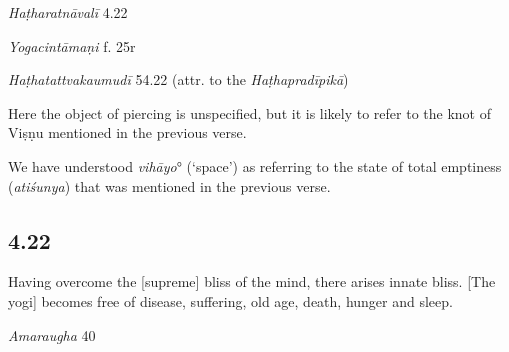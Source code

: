 \begin{ekdosis}
\begin{testimonia}[hp04_021]
\emph{Haṭharatnāvalī} 4.22
\begin{versinnote}
\end{versinnote}

\emph{Yogacintāmaṇi} f. 25r
\begin{versinnote}
\end{versinnote}

\emph{Haṭhatattvakaumudī} 54.22 (attr. to the \emph{Haṭhapradīpikā})
\begin{versinnote}
\end{versinnote}
\end{testimonia}

\begin{philcomm}[hp04_021]
Here the object of piercing is unspecified, but it is likely to refer to the knot of Viṣṇu mentioned in the previous verse.

We have understood \emph{vihāyo}° (`space') as referring to the state of total emptiness (\emph{atiśunya}) that was mentioned in the previous verse. 

\end{philcomm}

\subsection*{4.22}
\begin{translation}[hp04_022]
Having overcome the [supreme] bliss of the mind, there arises innate bliss. [The yogi] becomes free of disease, suffering, old age, death, hunger and sleep.
\end{translation}

\begin{sources}[hp04_022]
\emph{Amaraugha} 40
\begin{versinnote}
\tl{\var{paramānanda° ] \emph{Amaraugha}; cittānandaṃ \emph{Amaraughaprabodha}.}\\+}
\tl{\var{°rocitvāt ] \emph{Amaraugha}; tato jitvā \emph{Amaraughaprabodha}}\\!}
\end{versinnote}
\end{sources}


\end{ekdosis}
